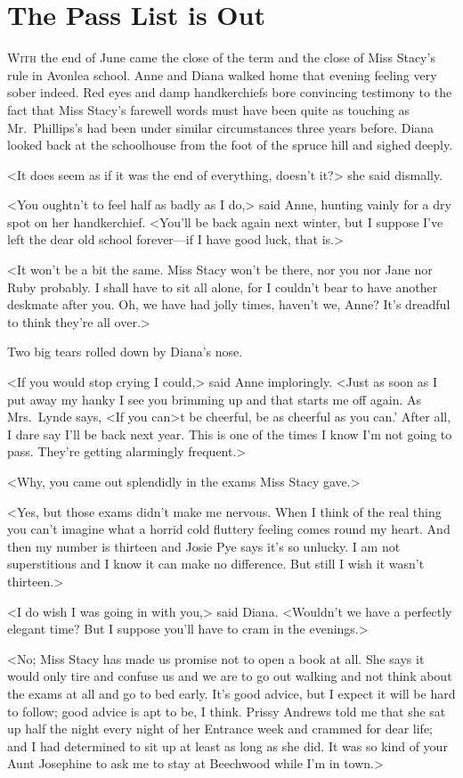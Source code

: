 \chapter{The Pass List is Out}

\lettrine{W}{ith} the end of June came the close of the term and the close of Miss Stacy's rule in Avonlea school. Anne and Diana walked home that evening feeling very sober indeed. Red eyes and damp handkerchiefs bore convincing testimony to the fact that Miss Stacy's farewell words must have been quite as touching as Mr.~Phillips's had been under similar circumstances three years before. Diana looked back at the schoolhouse from the foot of the spruce hill and sighed deeply.

<It does seem as if it was the end of everything, doesn't it?> she said dismally.

<You oughtn't to feel half as badly as I do,> said Anne, hunting vainly for a dry spot on her handkerchief. <You'll be back again next winter, but I suppose I've left the dear old school forever—if I have good luck, that is.>

<It won't be a bit the same. Miss Stacy won't be there, nor you nor Jane nor Ruby probably. I shall have to sit all alone, for I couldn't bear to have another deskmate after you. Oh, we have had jolly times, haven't we, Anne? It's dreadful to think they're all over.>

Two big tears rolled down by Diana's nose.

<If you would stop crying I could,> said Anne imploringly. <Just as soon as I put away my hanky I see you brimming up and that starts me off again. As Mrs.~Lynde says, <If you can>t be cheerful, be as cheerful as you can.' After all, I dare say I'll be back next year. This is one of the times I know I'm not going to pass. They're getting alarmingly frequent.>

<Why, you came out splendidly in the exams Miss Stacy gave.>

<Yes, but those exams didn't make me nervous. When I think of the real thing you can't imagine what a horrid cold fluttery feeling comes round my heart. And then my number is thirteen and Josie Pye says it's so unlucky. I am not superstitious and I know it can make no difference. But still I wish it wasn't thirteen.>

<I do wish I was going in with you,> said Diana. <Wouldn't we have a perfectly elegant time? But I suppose you'll have to cram in the evenings.>

<No; Miss Stacy has made us promise not to open a book at all. She says it would only tire and confuse us and we are to go out walking and not think about the exams at all and go to bed early. It's good advice, but I expect it will be hard to follow; good advice is apt to be, I think. Prissy Andrews told me that she sat up half the night every night of her Entrance week and crammed for dear life; and I had determined to sit up at least as long as she did. It was so kind of your Aunt Josephine to ask me to stay at Beechwood while I'm in town.>

